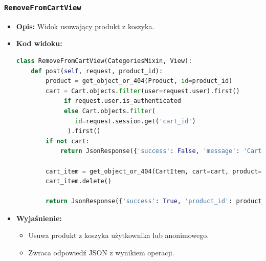 \documentclass[12pt,a4paper,oneside]{article}
\theoremstyle{definition}
\numberwithin{equation}{section}
\begin{document}
\subsubsection*{\texttt{RemoveFromCartView}}
\begin{itemize}
    \item \textbf{Opis:} Widok usuwający produkt z koszyka.
    \item \textbf{Kod widoku:}
\begin{lstlisting}[language=Python, caption=Kod widoku RemoveFromCartView]
class RemoveFromCartView(CategoriesMixin, View):
    def post(self, request, product_id):
        product = get_object_or_404(Product, id=product_id)
        cart = Cart.objects.filter(user=request.user).first()
             if request.user.is_authenticated 
             else Cart.objects.filter(
                id=request.session.get('cart_id')
              ).first()
        if not cart:
            return JsonResponse({'success': False, 'message': 'Cart not found'})

        cart_item = get_object_or_404(CartItem, cart=cart, product=product)
        cart_item.delete()

        return JsonResponse({'success': True, 'product_id': product_id})
\end{lstlisting}

    \item \textbf{Wyjaśnienie:}
    \begin{itemize}
        \item Usuwa produkt z koszyka użytkownika lub anonimowego.
        \item Zwraca odpowiedź JSON z wynikiem operacji.
    \end{itemize}
\end{itemize}
\end{document}
